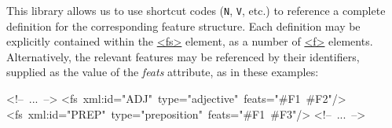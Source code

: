 This library allows us to use shortcut codes (\texttt{N}, \texttt{V}, etc.) to reference a complete definition for the corresponding feature structure. Each definition may be explicitly contained within the \hyperref[TEI.fs]{<fs>} element, as a number of \hyperref[TEI.f]{<f>} elements. Alternatively, the relevant features may be referenced by their identifiers, supplied as the value of the {\itshape feats} attribute, as in these examples: \par\bgroup\exampleFont \begin{shaded}\noindent\mbox{}<!-- ... -->\newline
<fs xml:id="ADJ" type="adjective" feats="\#F1 \#F2"/>\newline
<fs xml:id="PREP" type="preposition" feats="\#F1 \#F3"/>\newline
<!-- ... -->\newline
\end{shaded}\egroup\par \par
